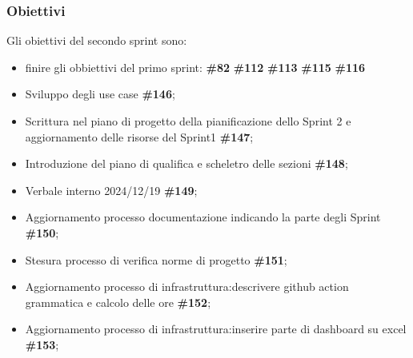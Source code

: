 \subsubsection{Obiettivi}

Gli obiettivi del secondo sprint sono:
\begin{itemize}
    \item finire gli obbiettivi del primo sprint: \textbf{\#82} \textbf{\#112} \textbf{\#113} \textbf{\#115} \textbf{\#116}
    \item Sviluppo degli use case \textbf{\#146};
    \item Scrittura nel piano di progetto della pianificazione dello Sprint 2 e aggiornamento delle risorse del Sprint1 \textbf{\#147};
    \item Introduzione del piano di qualifica e scheletro delle sezioni \textbf{\#148};
    \item Verbale interno 2024/12/19 \textbf{\#149};
    \item Aggiornamento processo documentazione indicando la parte degli Sprint \textbf{\#150};
    \item Stesura processo di verifica norme di progetto \textbf{\#151};
    \item Aggiornamento processo di infrastruttura:descrivere github action grammatica e calcolo delle ore \textbf{\#152};
    \item Aggiornamento processo di infrastruttura:inserire parte di dashboard su excel \textbf{\#153};
\end{itemize}